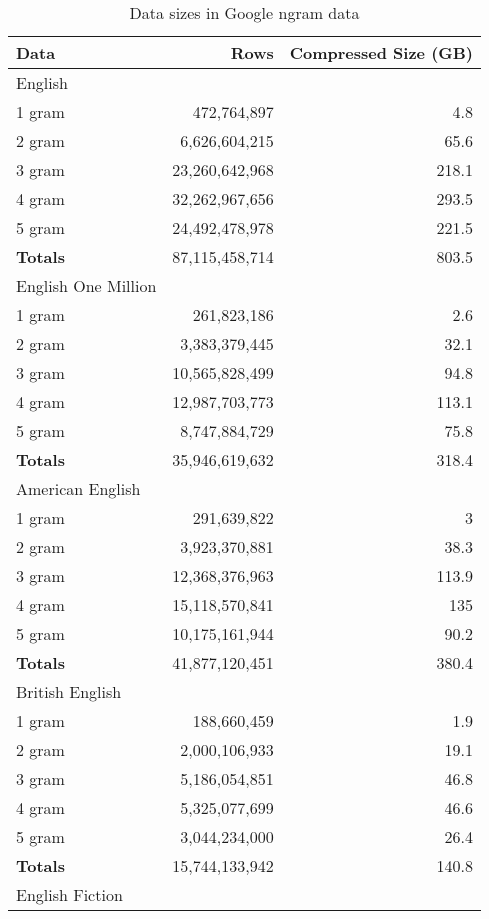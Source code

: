\documentclass[a4paper]{tufte-handout}
\begin{document}
\begin{table}[p]
  \label{tab:ngram-sizes}
  \centering
  \caption{Data sizes in Google ngram data}
  \begin{tabular}{lrr}
    \toprule
    Data 	&	Rows &	Compressed Size (GB)\\
    \midrule
    English\\
    \midrule
    1 gram &	472,764,897 &	4.8\\
    2 gram &	6,626,604,215 &	65.6\\
    3 gram &	23,260,642,968 &	218.1\\
    4 gram &	32,262,967,656 &	293.5\\
    5 gram &	24,492,478,978 &	221.5\\
    \textbf{Totals} &	87,115,458,714 &	803.5\\
    \midrule
    English One Million\\
    \midrule
    1 gram &	261,823,186 &	2.6\\
    2 gram &	3,383,379,445 &	32.1\\
    3 gram &	10,565,828,499 &	94.8\\
    4 gram &	12,987,703,773 &	113.1\\
    5 gram &	8,747,884,729 &	75.8\\
    \textbf{Totals} &	35,946,619,632 &	318.4\\
    \midrule
    American English\\
    \midrule
    1 gram &	291,639,822 &	3\\
    2 gram &	3,923,370,881 &	38.3\\
    3 gram &	12,368,376,963 &	113.9\\
    4 gram &	15,118,570,841 &	135\\
    5 gram &	10,175,161,944 &	90.2\\
    \textbf{Totals} &	41,877,120,451 &	380.4\\
    \midrule
    British English\\
    \midrule
    1 gram &	188,660,459 &	1.9\\
    2 gram &	2,000,106,933 &	19.1\\
    3 gram &	5,186,054,851 &	46.8\\
    4 gram &	5,325,077,699 &	46.6\\
    5 gram &	3,044,234,000 &	26.4\\
    \textbf{Totals} &	15,744,133,942 &	140.8\\
    \midrule
    English Fiction\\
    \midrule

\end{tabular}
\end{table}
\end{document}
